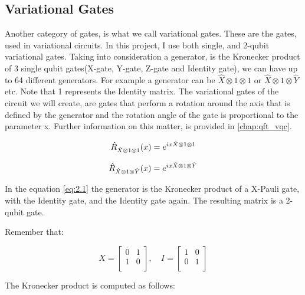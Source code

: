 \documentclass[inscr,ack,preface]{diphdthesis}
\begin{document}
\subsection{Variational Gates}

Another category of gates, is what we call variational gates. These are the gates, used in variational circuits. In this project, I use both single, and 2-\acrshort{qubit} variational gates. Taking into consideration a generator, is the Kronecker product of 3 single \acrshort{qubit} gates(X-gate, Y-gate, Z-gate and Identity gate), we can have up to 64 different generators. For example a generator can be $\hat{X}\otimes 1\otimes1$ or $\hat{X}\otimes 1\otimes \hat{Y}$ etc. Note that 1 represents the Identity matrix. The variational gates of the circuit we will create, are gates that perform a rotation around the axis that is defined by the generator and the rotation angle of the gate is proportional to the parameter x. Further information on this matter, is provided in \autoref{chap:qft_vqc}.

\begin{center}
\begin{equation}  
\Large\hat{R}_{\hat{X}\otimes 1\otimes1}(x)=e^{i x \hat{X}\otimes 1\otimes1}\label{eq:2.1}
\end{equation}

\begin{equation} 
\Large\hat{R}_{\hat{X}\otimes 1\otimes \hat{Y}}(x)=e^{i x \hat{X}\otimes 1\otimes\hat{Y}}\label{eq:2.2}
\end{equation}

\end{center}

In the equation {\ref{eq:2.1}} the generator is the Kronecker product of a X-Pauli gate, with the Identity gate, and the Identity gate again. The resulting matrix is a 2-\acrshort{qubit} gate.

Remember that: 

\[
X = \begin{bmatrix}
0 & 1 \\
1 & 0 \\
\end{bmatrix},
\quad
I = \begin{bmatrix}
1 & 0 \\
0 & 1 \\
\end{bmatrix}
\]

The Kronecker product is computed as follows:\\
\end{document}
